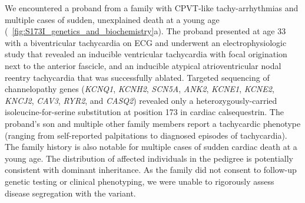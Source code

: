 We encountered a proband from a family with CPVT-like tachy-arrhythmias and multiple cases of sudden, unexplained death at a young age (\maintextfigure~\ref{fig:S173I_genetics_and_biochemistry}a). The proband presented at age 33 with a biventricular tachycardia on ECG and underwent an electrophysiologic study that revealed an inducible ventricular tachycardia with focal origination next to the anterior fascicle, and an inducible atypical atrioventricular nodal reentry tachycardia that was successfully ablated. Targeted sequencing of channelopathy genes (\textit{KCNQ1}, \textit{KCNH2}, \textit{SCN5A}, \textit{ANK2}, \textit{KCNE1}, \textit{KCNE2}, \textit{KNCJ2}, \textit{CAV3}, \textit{RYR2}, and \textit{CASQ2}) revealed only a heterozygously-carried isoleucine-for-serine substitution at position 173 in cardiac calsequestrin. The proband's son and multiple other family members report a tachycardic phenotype (ranging from self-reported palpitations to diagnosed episodes of tachycardia). The family history is also notable for multiple cases of sudden cardiac death at a young age. The distribution of affected individuals in the pedigree is potentially consistent with dominant inheritance. As the family did not consent to follow-up genetic testing or clinical phenotyping, we were unable to rigorously assess disease segregation with the variant.


